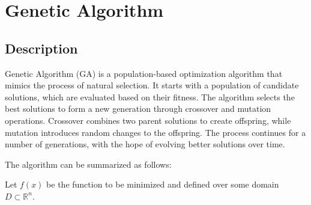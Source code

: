 \documentclass{article}
\begin{document}
\section{Genetic Algorithm}

\subsection{Description}

Genetic Algorithm (GA) is a population-based optimization algorithm
that mimics the process of natural selection. It starts with a
population of candidate solutions, which are evaluated based on their
fitness. The algorithm selects the best solutions to form a new
generation through crossover and mutation operations. Crossover combines
two parent solutions to create offspring, while mutation introduces
random changes to the offspring. The process continues for a number of
generations, with the hope of evolving better solutions over time.

The algorithm can be summarized as follows:

Let $f(x)$ be the function to be minimized and defined over some domain
$D \subset \mathbb{R}^n$.
\end{document}
